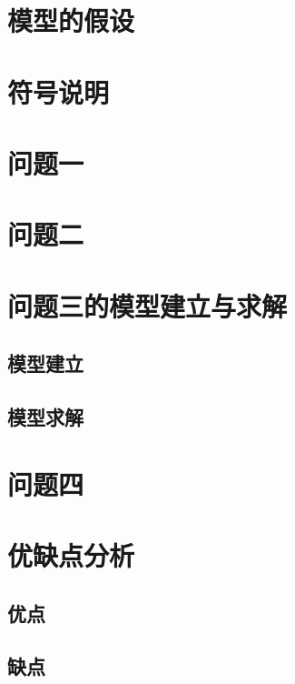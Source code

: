\documentclass[withoutpreface,bwprint]{cumcmthesis} %
\begin{document}
    
    
    \section{模型的假设}

    \section{符号说明}

    \section{问题一}
    
    \section{问题二}
    
    \section{问题三的模型建立与求解}
    
    \subsection{模型建立}
    
    \subsection{模型求解}
    
    \section{问题四}
    
    \section{优缺点分析}
    
    \subsection{优点}
     
    \subsection{缺点}
    
    
    
    
\end{document}

